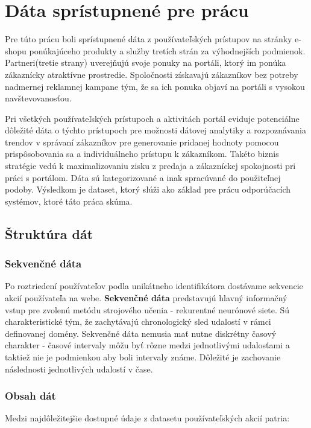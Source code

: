 \chapter{Dáta sprístupnené pre prácu}
\label{analyza_data}

Pre túto prácu boli sprístupnené dáta z používateľských prístupov na stránky e-shopu ponúkajúceho produkty a služby tretích strán za výhodnejších podmienok. Partneri(tretie strany) uverejňujú svoje ponuky na portáli, ktorý im ponúka zákaznícky atraktívne prostredie. Spoločnosti získavajú zákazníkov bez potreby nadmernej reklamnej kampane tým, že sa ich ponuka objaví na portáli s vysokou navštevovanosťou.

Pri všetkých používateľských prístupoch a aktivitách portál eviduje potenciálne dôležité dáta o týchto prístupoch pre možnosti dátovej analytiky a rozpoznávania trendov v správaní zákazníkov pre generovanie pridanej hodnoty pomocou prispôsobovania sa a individuálneho prístupu k zákazníkom. Takéto biznis stratégie vedú k maximalizovaniu zisku z predaja a zákazníckej spokojnosti pri práci s portálom. Dáta sú kategorizované a inak spracúvané do použiteľnej podoby. Výsledkom je dataset, ktorý slúži ako základ pre prácu odporúčacích systémov, ktoré táto práca skúma.

\section{Štruktúra dát}



\subsection{Sekvenčné dáta}

Po roztriedení používateľov podla unikátneho identifikátora dostávame sekvencie akcií používateľa na webe. \textbf{Sekvenčné dáta} predstavujú hlavný informačný vstup pre zvolenú metódu strojového učenia - rekurentné neurónové siete. Sú charakteristické tým, že zachytávajú chronologický sled udalostí v rámci definovanej domény. Sekvenčné dáta nemusia mať nutne diskrétny časový charakter - časové intervaly môžu byť rôzne medzi jednotlivými udalosťami a taktiež nie je podmienkou aby boli intervaly známe. Dôležité je zachovanie následnosti jednotlivých udalostí v čase.

\subsection{Obsah dát}
Medzi najdôležitejšie dostupné údaje z datasetu používateľských akcií patria:

